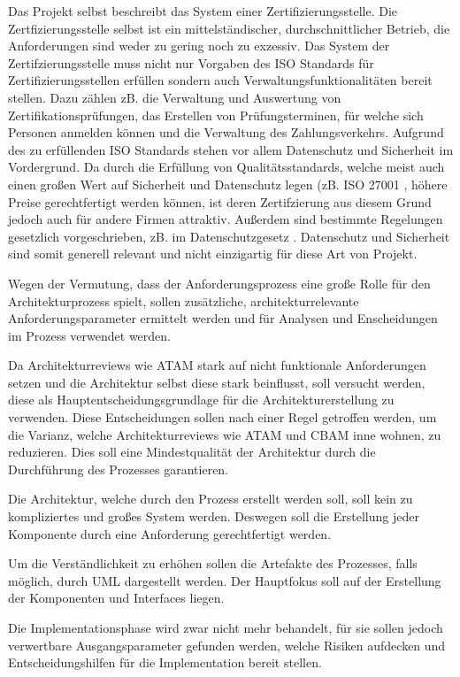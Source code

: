 Das Projekt selbst beschreibt das System einer Zertifizierungsstelle. Die Zertfizierungsstelle selbst ist ein mittelständischer, durchschnittlicher Betrieb, die Anforderungen sind weder zu gering noch zu exzessiv. Das System der Zertifzierungsstelle muss nicht nur Vorgaben des ISO Standards für Zertifizierungsstellen erfüllen \cite{ISO_CERT} sondern auch Verwaltungsfunktionalitäten bereit stellen. Dazu zählen zB. die Verwaltung und Auswertung von Zertifikationsprüfungen, das Erstellen von Prüfungsterminen, für welche sich Personen anmelden können und die Verwaltung des Zahlungsverkehrs. Aufgrund des zu erfüllenden ISO Standards stehen vor allem Datenschutz und Sicherheit im Vordergrund. Da durch die Erfüllung von Qualitätsstandards, welche meist auch einen großen Wert auf Sicherheit und Datenschutz legen (zB. ISO 27001 \cite{ISO_SEC}, höhere Preise gerechtfertigt werden können, ist deren Zertifzierung aus diesem Grund jedoch auch für andere Firmen attraktiv. Außerdem sind bestimmte Regelungen gesetzlich vorgeschrieben, zB. im Datenschutzgesetz \cite[§ 14]{datenschutz}. Datenschutz und Sicherheit sind somit generell relevant und nicht einzigartig für diese Art von Projekt.

Wegen der Vermutung, dass der Anforderungsprozess eine große Rolle für den Architekturprozess spielt, sollen zusätzliche, architekturrelevante Anforderungsparameter ermittelt werden und für Analysen und Enscheidungen im Prozess verwendet werden.

Da Architekturreviews wie ATAM stark auf nicht funktionale Anforderungen setzen und die Architektur selbst diese stark beinflusst, soll versucht werden, diese als Hauptentscheidungsgrundlage für die Architekturerstellung zu verwenden. Diese Entscheidungen sollen nach einer Regel getroffen werden, um die Varianz, welche Architekturreviews wie ATAM und CBAM inne wohnen, zu reduzieren. Dies soll eine Mindestqualität der Architektur durch die Durchführung des Prozesses garantieren.

Die Architektur, welche durch den Prozess erstellt werden soll, soll kein zu kompliziertes und großes System werden. Deswegen soll die Erstellung jeder Komponente durch eine Anforderung gerechtfertigt werden.

Um die Verständlichkeit zu erhöhen sollen die Artefakte des Prozesses, falls möglich, durch UML dargestellt werden. Der Hauptfokus soll auf der Erstellung der Komponenten und Interfaces liegen.

Die Implementationsphase wird zwar nicht mehr behandelt, für sie sollen jedoch verwertbare Ausgangsparameter gefunden werden, welche Risiken aufdecken und Entscheidungshilfen für die Implementation bereit stellen.


